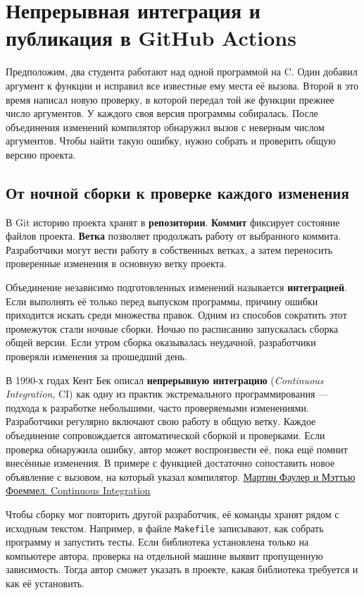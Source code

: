 \chapter[CI/CD в GitHub Actions]{Непрерывная интеграция и публикация в GitHub Actions}
\label{ch:26-ci}

Предположим, два студента работают над одной программой на C. Один добавил аргумент к функции и исправил все известные ему места её вызова. Второй в это время написал новую проверку, в которой передал той же функции прежнее число аргументов. У каждого своя версия программы собиралась. После объединения изменений компилятор обнаружил вызов с неверным числом аргументов. Чтобы найти такую ошибку, нужно собрать и проверить общую версию проекта.

\section{От ночной сборки к проверке каждого изменения}

В Git историю проекта хранят в \textbf{репозитории}. \textbf{Коммит} фиксирует состояние файлов проекта. \textbf{Ветка} позволяет продолжать работу от выбранного коммита. Разработчики могут вести работу в собственных ветках, а затем переносить проверенные изменения в основную ветку проекта.

Объединение независимо подготовленных изменений называется \textbf{интеграцией}. Если выполнять её только перед выпуском программы, причину ошибки приходится искать среди множества правок. Одним из способов сократить этот промежуток стали ночные сборки. Ночью по расписанию запускалась сборка общей версии. Если утром сборка оказывалась неудачной, разработчики проверяли изменения за прошедший день.

В 1990-х годах Кент Бек описал \textbf{непрерывную интеграцию} (\emph{Continuous Integration}, CI) как одну из практик экстремального программирования — подхода к разработке небольшими, часто проверяемыми изменениями. Разработчики регулярно включают свою работу в общую ветку. Каждое объединение сопровождается автоматической сборкой и проверками. Если проверка обнаружила ошибку, автор может воспроизвести её, пока ещё помнит внесённые изменения. В примере с функцией достаточно сопоставить новое объявление с вызовом, на который указал компилятор. \href{https://martinfowler.com/articles/originalContinuousIntegration.html}{Мартин Фаулер и Мэттью Фоеммел. Continuous Integration}

Чтобы сборку мог повторить другой разработчик, её команды хранят рядом с исходным текстом. Например, в файле \texttt{Makefile} записывают, как собрать программу и запустить тесты. Если библиотека установлена только на компьютере автора, проверка на отдельной машине выявит пропущенную зависимость. Тогда автор сможет указать в проекте, какая библиотека требуется и как её установить.

